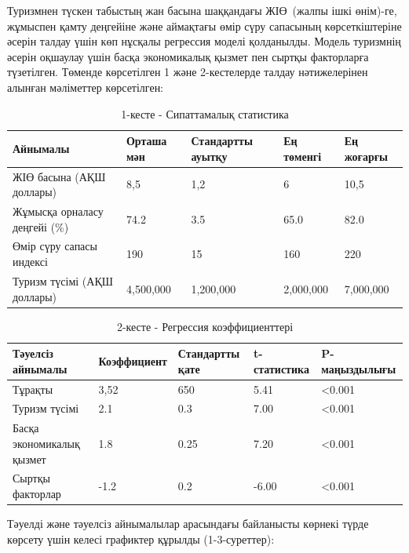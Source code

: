 \begin{multicols}{2}
Туризмнен түскен табыстың жан басына шаққандағы ЖІӨ~(жалпы ішкі
өнім)-ге, жұмыспен қамту деңгейіне және аймақтағы өмір сүру сапасының
көрсеткіштеріне әсерін талдау үшін көп нұсқалы регрессия моделі
қолданылды. Модель туризмнің әсерін оқшаулау үшін басқа экономикалық
қызмет пен сыртқы факторларға түзетілген. Төменде көрсетілген 1 және
2-кестелерде талдау нәтижелерінен алынған мәліметтер көрсетілген:
\end{multicols}

\begin{table}[H]
\caption*{1-кесте - Сипаттамалық статистика}
\centering
\begin{tabular}{|l|l|l|l|l|}
\hline
Айнымалы & Орташа мән & Стандартты ауытқу & Ең төменгі & Ең жоғарғы \\ \hline
ЖІӨ басына (АҚШ доллары) & 8,5 & 1,2 & 6 & 10,5 \\ \hline
Жұмысқа орналасу деңгейі (\%) & 74.2 & 3.5 & 65.0 & 82.0 \\ \hline
Өмір сүру сапасы индексі & 190 & 15 & 160 & 220 \\ \hline
Туризм түсімі (АҚШ доллары) & 4,500,000 & 1,200,000 & 2,000,000 & 7,000,000 \\ \hline
\end{tabular}
\end{table}

\begin{table}[H]
\caption*{2-кесте - Регрессия коэффициенттері}
\centering
\begin{tabular}{|l|l|l|l|l|}
\hline
Тәуелсіз айнымалы & Коэффициент & Стандартты қате & t-статистика & P-маңыздылығы \\ \hline
Тұрақты & 3,52 & 650 & 5.41 & \textless{}0.001 \\ \hline
Туризм түсімі & 2.1 & 0.3 & 7.00 & \textless{}0.001 \\ \hline
Басқа экономикалық қызмет & 1.8 & 0.25 & 7.20 & \textless{}0.001 \\ \hline
Сыртқы факторлар & -1.2 & 0.2 & -6.00 & \textless{}0.001 \\ \hline
\end{tabular}
\end{table}

Тәуелді және тәуелсіз айнымалылар арасындағы байланысты көрнекі түрде
көрсету үшін келесі графиктер құрылды (1-3-суреттер):

